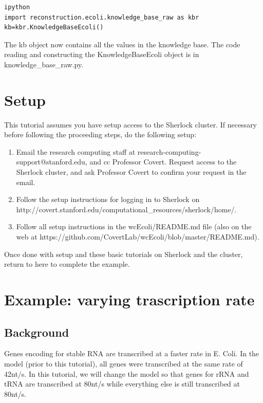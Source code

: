 \documentclass[12pt]{article}
\begin{document}
\begin{lstlisting}
ipython
import reconstruction.ecoli.knowledge_base_raw as kbr
kb=kbr.KnowledgeBaseEcoli()
\end{lstlisting}

The kb object now contains all the values in the knowledge base. The code reading and constructing the KnowledgeBaseEcoli object is in knowledge\_base\_raw.py.


\section{Setup}

This tutorial assumes you have setup access to the Sherlock cluster. If necessary before following the proceeding steps, do the following setup:

\begin{enumerate}
\item Email the research computing staff at research-computing-support@stanford.edu, and cc Professor Covert. Request access to the Sherlock cluster, and ask Professor Covert to confirm your request in the email.

\item Follow the setup instructions for logging in to Sherlock on
\linebreak
http://covert.stanford.edu/computational\_resources/sherlock/home/.

\item Follow all setup instructions in the wcEcoli/README.md file (also on the web at https://github.com/CovertLab/wcEcoli/blob/master/README.md).
\end{enumerate}

Once done with setup and these basic tutorials on Sherlock and the cluster, return to here to complete the example.



\section{Example: varying trascription rate}

\subsection{Background}

Genes encoding for stable RNA are transcribed at a faster rate in E. Coli. In the model (prior to this tutorial), all genes were transcribed at the same rate of 42nt/s. In this tutorial, we will change the model so that genes for rRNA and tRNA are transcribed at 80nt/s while everything else is still transcribed at 80nt/s. 
\par
\end{document}
